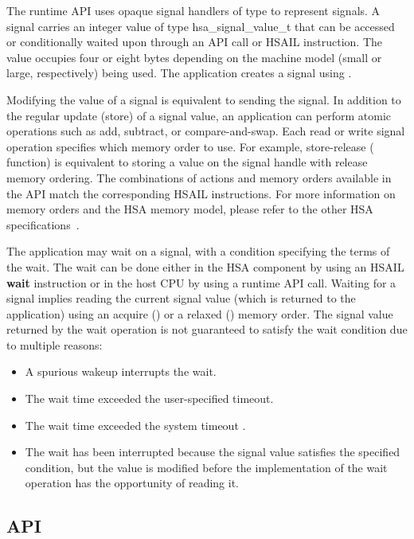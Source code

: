 \documentclass[final,oneside]{book}
\newcommand{\reffun}[1]{\textbf{#1}}
\newcommand{\reftyp}[1]{#1}
\newcommand{\refhsl}[1]{\reffun{#1}}
\begin{document}
The runtime API uses opaque signal handlers of type  to
represent signals. A signal carries an integer value of type
\reftyp{hsa_signal_value_t} that can be accessed or conditionally waited upon
through an API call or HSAIL instruction. The value occupies four or eight bytes
depending on the machine model (small or large, respectively) being used. The
application creates a signal using .

Modifying the value of a signal is equivalent to sending the signal. In addition
to the regular update (store) of a signal value, an application can perform
atomic operations such as add, subtract, or compare-and-swap. Each read or write
signal operation specifies which memory order to use. For example, store-release
( function) is equivalent to storing a value on
the signal handle with release memory ordering. The combinations of actions and
memory orders available in the API match the corresponding HSAIL
instructions. For more information on memory orders and the HSA memory model,
please refer to the other HSA specifications~\cite{prm, sar}.

The application may wait on a signal, with a condition specifying the terms of
the wait. The wait can be done either in the HSA component by using an HSAIL
\refhsl{wait} instruction or in the host CPU by using a runtime API
call. Waiting for a signal implies reading the current signal value (which is
returned to the application) using an acquire ()
or a relaxed () memory order. The signal value
returned by the wait operation is not guaranteed to satisfy the wait condition
due to multiple reasons:
\begin{itemize}[itemsep=1pt,topsep=3pt,partopsep=0pt]
\item A spurious wakeup interrupts the wait.
\item The wait time exceeded the user-specified timeout.
\item The wait time exceeded the system timeout
  .
\item The wait has been interrupted because the signal value satisfies the
  specified condition, but the value is modified before the implementation of
  the wait operation has the opportunity of reading it.
\end{itemize}


\subsection{API}
\end{document}
